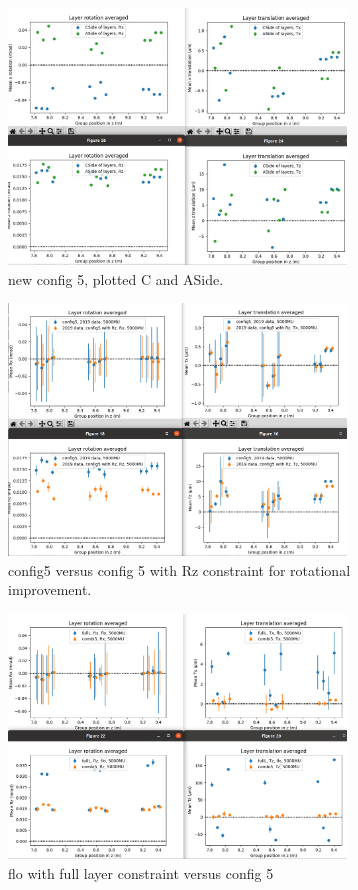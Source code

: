 \begin{figure}
  \centering
  \includegraphics[width=0.8\textwidth]{plots/august_13/CA_side_newconfig5.png}
  \caption{new config 5, plotted C and ASide.}
  \label{fig:aug13_CA_new}
\end{figure}

\begin{figure}
  \centering
  \includegraphics[width=0.8\textwidth]{plots/august_13/2019_c5_old_vs_withRz_MU.png}
  \caption{config5 versus config 5 with Rz constraint for rotational improvement.}
  \label{fig:withRz}
\end{figure}

\begin{figure}
  \centering
  \includegraphics[width=0.8\textwidth]{plots/august_13/combi5_layers_averaged.png}
  \caption{flo with full layer constraint versus config 5}
  \label{fig:floFullL_c5}
\end{figure}

